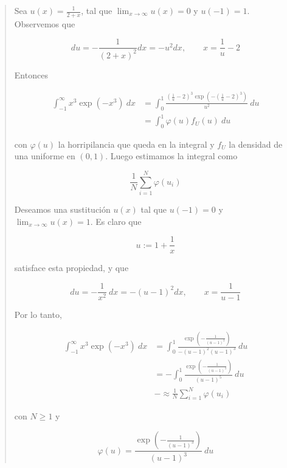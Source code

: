 \documentclass[a4paper, 12pt]{article}
\begin{document}
\small
\begin{quote}

Sea $u(x) = \frac{1}{2 + x}$, tal que $\lim_{x \to \infty} u(x) = 0$ y $u(-1) =1$.
Observemos que 

\begin{equation*}
  du = -\frac{1}{(2+x)^2} dx = -u^2 dx, \qquad x = \frac{1}{u} - 2
\end{equation*}

Entonces 

\begin{align*}
  \int_{-1}^\infty x^3 \exp\left( -x^3 \right) ~ dx
  &= \int_0^1 
 \frac{\left( \frac{1}{u} -2 \right)^3 \exp\left( -\left(
   \frac{1}{u}-2\right)^3\right)}{u^2}  ~ du \\ 
  &= \int_0^1 \varphi(u) f_U(u) ~ du
\end{align*}

con $\varphi(u)$ la horripilancia que queda en la integral y $f_U$ la densidad
de una uniforme en $(0, 1)$. Luego estimamos la integral como 

\begin{equation*}
  \frac{1}{N} \sum_{i=1}^N \varphi(u_i)
\end{equation*}

\pagebreak

Deseamos una sustitución $u(x)$ tal que $u(-1) = 0$ y $\lim_{x \to \infty} u(x)
= 1$. Es claro que

\begin{equation*}
  u := 1 + \frac{1}{x}
\end{equation*}

satisface esta propiedad, y que

\begin{equation*}
  du = -\frac{1}{x^2} ~ dx = -(u-1)^2 dx, \qquad x = \frac{1}{u-1}
\end{equation*}

Por lo tanto, 

\begin{align*}
  \int_{-1}^\infty x^3 \exp\left( -x^3 \right) ~ dx
  &= \int_0^1 \frac{\exp\left( -\frac{1}{(u-1)^3} \right) }{-(u-1)^2(u-1)^3} ~
  du \\ 
  &= -\int_0^1 \frac{\exp\left( -\frac{1}{(u-1)^3} \right) }{(u-1)^5} ~ du \\ 
  &-\approx \frac{1}{N} \sum_{i=1}^N \varphi(u_i)
\end{align*}

con $N \geq 1$ y

\begin{equation*}
  \varphi(u) = \frac{\exp\left( - \frac{1}{(u-1)^3} \right) }{(u-1)^3} ~ du
\end{equation*}


\end{quote}
\normalsize
\end{document}
